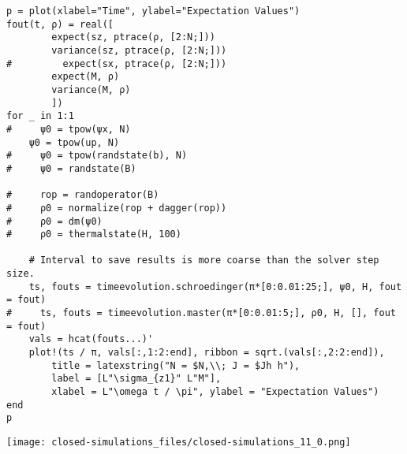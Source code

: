 \documentclass[../../thesis.tex]{subfiles}
\begin{document}
\begin{verbatim}
p = plot(xlabel="Time", ylabel="Expectation Values")
fout(t, ρ) = real([
        expect(sz, ptrace(ρ, [2:N;]))
        variance(sz, ptrace(ρ, [2:N;]))
#         expect(sx, ptrace(ρ, [2:N;]))
        expect(M, ρ)
        variance(M, ρ)
        ])
for _ in 1:1
#     ψ0 = tpow(ψx, N)
    ψ0 = tpow(up, N)
#     ψ0 = tpow(randstate(b), N)
#     ψ0 = randstate(B)
    
#     rop = randoperator(B)
#     ρ0 = normalize(rop + dagger(rop))
#     ρ0 = dm(ψ0)
#     ρ0 = thermalstate(H, 100)
        
    # Interval to save results is more coarse than the solver step size.
    ts, fouts = timeevolution.schroedinger(π*[0:0.01:25;], ψ0, H, fout = fout)
#     ts, fouts = timeevolution.master(π*[0:0.01:5;], ρ0, H, [], fout = fout)
    vals = hcat(fouts...)'
    plot!(ts / π, vals[:,1:2:end], ribbon = sqrt.(vals[:,2:2:end]),
        title = latexstring("N = $N,\\; J = $Jh h"),
        label = [L"\sigma_{z1}" L"M"],
        xlabel = L"\omega t / \pi", ylabel = "Expectation Values")
end
p
\end{verbatim}

\texttt{[image: closed-simulations\_files/closed-simulations\_11\_0.png]}
\end{document}
